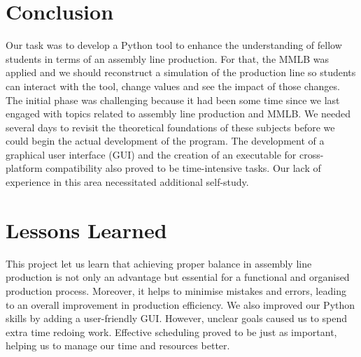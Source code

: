 \section{Conclusion}
Our task was to develop a Python tool to enhance the understanding of fellow students in terms of an assembly line production. For that, the MMLB was applied and we should reconstruct a simulation of the production line so students can interact with the tool, change values and see the impact of those changes. The initial phase was challenging because it had been some time since we last engaged with topics related to assembly line production and MMLB. We needed several days to revisit the theoretical foundations of these subjects before we could begin the actual development of the program. The development of a graphical user interface (GUI) and the creation of an executable for cross-platform compatibility also proved to be time-intensive tasks. Our lack of experience in this area necessitated additional self-study.
\vspace{-0.3cm}
\section{Lessons Learned}
This project let us learn that achieving proper balance in assembly line production is not only an advantage but essential for a functional and organised production process. Moreover, it helps to minimise mistakes and errors, leading to an overall improvement in production efficiency. We also improved our Python skills by adding a user-friendly GUI. However, unclear goals caused us to spend extra time redoing work. Effective scheduling proved to be just as important, helping us to manage our time and resources better.






